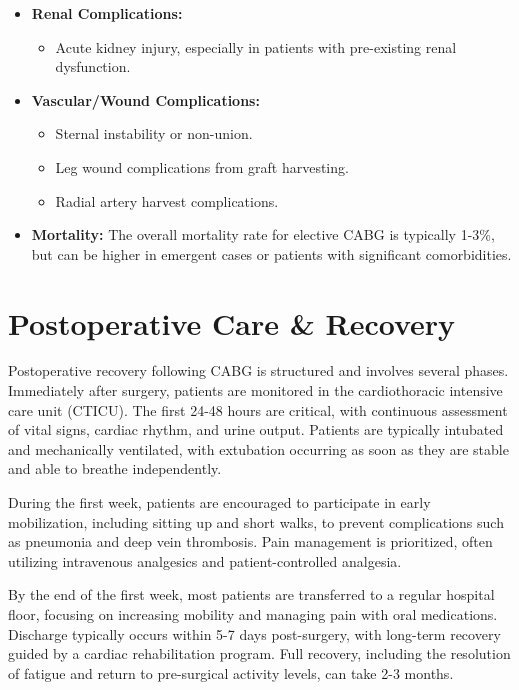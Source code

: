 \begin{itemize}
  \item \textbf{Renal Complications:}
    \begin{itemize}
      \item Acute kidney injury, especially in patients with pre-existing renal dysfunction.
    \end{itemize}

  \item \textbf{Vascular/Wound Complications:}
    \begin{itemize}
      \item Sternal instability or non-union.
      \item Leg wound complications from graft harvesting.
      \item Radial artery harvest complications.
    \end{itemize}

  \item \textbf{Mortality:} The overall mortality rate for elective CABG is typically 1-3\%, but can be higher in emergent cases or patients with significant comorbidities.
\end{itemize}

\section*{Postoperative Care \& Recovery}
Postoperative recovery following CABG is structured and involves several phases. Immediately after surgery, patients are monitored in the cardiothoracic intensive care unit (CTICU). The first 24-48 hours are critical, with continuous assessment of vital signs, cardiac rhythm, and urine output. Patients are typically intubated and mechanically ventilated, with extubation occurring as soon as they are stable and able to breathe independently.

During the first week, patients are encouraged to participate in early mobilization, including sitting up and short walks, to prevent complications such as pneumonia and deep vein thrombosis. Pain management is prioritized, often utilizing intravenous analgesics and patient-controlled analgesia.

By the end of the first week, most patients are transferred to a regular hospital floor, focusing on increasing mobility and managing pain with oral medications. Discharge typically occurs within 5-7 days post-surgery, with long-term recovery guided by a cardiac rehabilitation program. Full recovery, including the resolution of fatigue and return to pre-surgical activity levels, can take 2-3 months.

